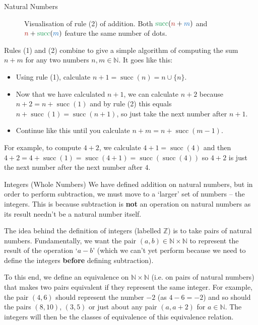 \documentclass[final]{beamer}
\newlength{\colwidth}
\newcommand{\N}{\mathbb{N}}
\newcommand{\Z}{\mathbb{Z}}
\DeclareMathOperator{\s}{succ}
\newcommand{\clr}{\textcolor{BrickRed}}
\newcommand{\clb}{\textcolor{RoyalBlue}}
\newcommand{\clg}{\textcolor{ForestGreen}}
\begin{document}
\begin{frame}[t]
\begin{columns}[t]
\begin{column}{\colwidth}
\begin{exampleblock}{Natural Numbers}
\begin{figure}[H]

   \caption{Visualisation of rule (2) of addition. Both $\clg{\s}(\clr{n} +
    \clb{m})$ and $\clr{n} + \clg{\s}(\clb{m})$ feature the \alert{same number}
    of dots.}
   \label{fig:rule-2-addition}
  \end{figure}

  Rules (1) and (2) combine to give a simple algorithm of computing the sum $n +
  m$ for any two numbers $n,m \in \N$. It goes like this:
  \begin{itemize}[label=\textbullet,left=12pt]
   \item Using rule (1), calculate $n + 1 = \s(n) = n \cup \{n\}$.
   \item Now that we have calculated $n + 1$, we can calculate $n + 2$ because
    $n + 2 = n + \s(1)$ and by rule (2) this equals $n + \s(1) = \s(n + 1)$, so
    just take the next number after $n + 1$.
   \item Continue like this until you calculate $n + m = n + \s(m - 1)$.
  \end{itemize}
  For example, to compute $4 + 2$, we calculate $4 + 1 = \s(4)$ and then $4 + 2
  = 4 + \s(1) = \s(4 + 1) = \s(\s(4))$ so $4 + 2$ is just the next number after
  the next number after $4$.
 \end{exampleblock}

 \begin{exampleblock}{Integers (Whole Numbers)}
  We have defined \alert{addition} on natural numbers, but in order to perform
  \alert{subtraction}, we must move to a `larger' set of numbers -- the
  \alert{integers}. This is because subtraction is \alert{\textbf{not}} an
  operation on natural numbers as its result needn't be a natural number itself.

  The idea behind the definition of integers (labelled $\Z$) is to take
  \alert{pairs of natural numbers}. Fundamentally, we want the pair $(a,b) \in
  \N \times \N$ to \alert{represent} the result of the operation `$a-b$' (which
  we can't yet perform because we need to define the integers \textbf{before}
  defining subtraction).

  To this end, we define an \alert{equivalence} on $\N \times \N$ (i.e. on pairs
  of natural numbers) that makes two pairs equivalent \alert{if they represent
  the same integer}. For example, the pair $(4, 6)$ should represent the number
  $-2$ (as $4 - 6 = -2$) and so should the pairs $(8, 10)$, $(3, 5)$ or just
  about any pair $(a, a + 2)$ for $a \in \N$. The integers will then be the
  \alert{classes of equivalence} of this equivalence relation.


\end{exampleblock}
\end{column}
\end{columns}
\end{frame}
\end{document}
